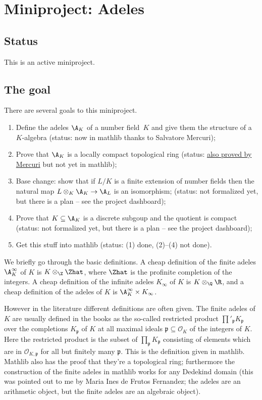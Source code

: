 \chapter{Miniproject: Adeles}\label{Adele_miniproject}

\section{Status}

This is an active miniproject.

\section{The goal}

There are several goals to this miniproject.

\begin{enumerate}
  \item Define the adeles $\A_K$ of a number field~$K$ and
    give them the structure of a $K$-algebra (status: now in mathlib thanks to
    Salvatore Mercuri);
  \item Prove that $\A_K$ is a locally compact topological ring (status:
      \href{https://github.com/smmercuri/adele-ring_locally-compact}{
      also proved by Mercuri} but not yet in mathlib);
  \item Base change: show that if $L/K$ is a finite extension of number fields then the
    natural map $L\otimes_K\A_K\to\A_L$ is an isomorphism; (status: not
    formalized yet, but there is a plan -- see the project dashboard);
  \item Prove that $K \subseteq \A_K$ is a discrete subgoup and the quotient
    is compact (status: not formalized yet, but there is a plan -- see the project
    dashboard);
  \item Get this stuff into mathlib (status: (1) done, (2)--(4) not done).
\end{enumerate}

We briefly go through the basic definitions. A cheap definition of the finite
adeles $\A_K^\infty$ of $K$ is $K\otimes_{\Z}\Zhat$, where $\Zhat$ is
the profinite completion of the integers. A cheap definition of the infinite adeles
$K_\infty$ of $K$ is $K\otimes_{\Q}\R$, and a cheap definition of the adeles
of $K$ is $\A_K^\infty\times K_\infty$.

However in the literature different definitions
are often given. The finite adeles of $K$ are usually defined in the books
as the so-called restricted product $\prod'_{\mathfrak{p}}K_{\mathfrak{p}}$ over the completions
$K_{\mathfrak{p}}$ of $K$ at all maximal ideals $\mathfrak{p}\subseteq\mathcal{O}_K$ of the
integers of $K$. Here the restricted product is the subset of $\prod_{\mathfrak{p}}K_{\mathfrak{p}}$
consisting of elements which are in $\mathcal{O}_{K,\mathfrak{p}}$ for all but finitely many
$\mathfrak{p}$. This is the definition given in mathlib.
Mathlib also has the proof that they're a topological ring;
furthermore the construction of the finite adeles in mathlib works for any
Dedekind domain (this was pointed out to me by Maria Ines de Frutos Fernandez; the adeles
are an arithmetic object, but the finite adeles are an algebraic object).

